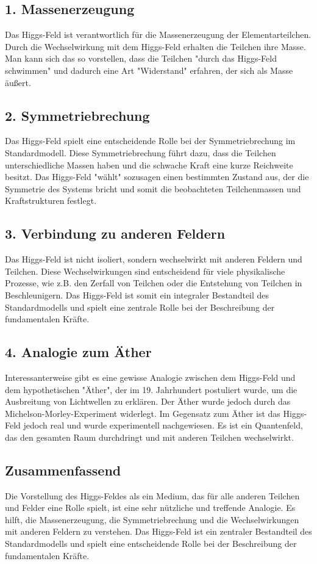 \documentclass{article}
\begin{document}
\subsection{1. Massenerzeugung}

Das Higgs-Feld ist verantwortlich für die Massenerzeugung der Elementarteilchen. Durch die Wechselwirkung mit dem Higgs-Feld erhalten die Teilchen ihre Masse. Man kann sich das so vorstellen, dass die Teilchen "durch das Higgs-Feld schwimmen" und dadurch eine Art "Widerstand" erfahren, der sich als Masse äußert.

\subsection{2. Symmetriebrechung}

Das Higgs-Feld spielt eine entscheidende Rolle bei der Symmetriebrechung im Standardmodell. Diese Symmetriebrechung führt dazu, dass die Teilchen unterschiedliche Massen haben und die schwache Kraft eine kurze Reichweite besitzt. Das Higgs-Feld "wählt" sozusagen einen bestimmten Zustand aus, der die Symmetrie des Systems bricht und somit die beobachteten Teilchenmassen und Kraftstrukturen festlegt.

\subsection{3. Verbindung zu anderen Feldern}

Das Higgs-Feld ist nicht isoliert, sondern wechselwirkt mit anderen Feldern und Teilchen. Diese Wechselwirkungen sind entscheidend für viele physikalische Prozesse, wie z.B. den Zerfall von Teilchen oder die Entstehung von Teilchen in Beschleunigern. Das Higgs-Feld ist somit ein integraler Bestandteil des Standardmodells und spielt eine zentrale Rolle bei der Beschreibung der fundamentalen Kräfte.

\subsection{4. Analogie zum Äther}

Interessanterweise gibt es eine gewisse Analogie zwischen dem Higgs-Feld und dem hypothetischen "Äther", der im 19. Jahrhundert postuliert wurde, um die Ausbreitung von Lichtwellen zu erklären. Der Äther wurde jedoch durch das Michelson-Morley-Experiment widerlegt. Im Gegensatz zum Äther ist das Higgs-Feld jedoch real und wurde experimentell nachgewiesen. Es ist ein Quantenfeld, das den gesamten Raum durchdringt und mit anderen Teilchen wechselwirkt.

\subsection{Zusammenfassend}

Die Vorstellung des Higgs-Feldes als ein Medium, das für alle anderen Teilchen und Felder eine Rolle spielt, ist eine sehr nützliche und treffende Analogie. Es hilft, die Massenerzeugung, die Symmetriebrechung und die Wechselwirkungen mit anderen Feldern zu verstehen. Das Higgs-Feld ist ein zentraler Bestandteil des Standardmodells und spielt eine entscheidende Rolle bei der Beschreibung der fundamentalen Kräfte.
	
\end{document}
